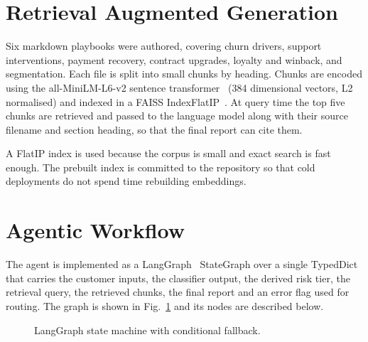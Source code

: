 \documentclass[conference]{IEEEtran}
\begin{document}
\section{Retrieval Augmented Generation}
Six markdown playbooks were authored, covering churn drivers, support interventions, payment recovery, contract upgrades, loyalty and winback, and segmentation. Each file is split into small chunks by heading. Chunks are encoded using the all-MiniLM-L6-v2 sentence transformer~\cite{reimers2019} (384 dimensional vectors, L2 normalised) and indexed in a FAISS IndexFlatIP~\cite{johnson2019}. At query time the top five chunks are retrieved and passed to the language model along with their source filename and section heading, so that the final report can cite them.

A FlatIP index is used because the corpus is small and exact search is fast enough. The prebuilt index is committed to the repository so that cold deployments do not spend time rebuilding embeddings.

\section{Agentic Workflow}
The agent is implemented as a LangGraph~\cite{langgraph} StateGraph over a single TypedDict that carries the customer inputs, the classifier output, the derived risk tier, the retrieval query, the retrieved chunks, the final report and an error flag used for routing. The graph is shown in Fig.~\ref{fig:graph} and its nodes are described below.

\begin{figure}[!h]
\centering
{}
\caption{LangGraph state machine with conditional fallback.}
\label{fig:graph}
\end{figure}
\end{document}
